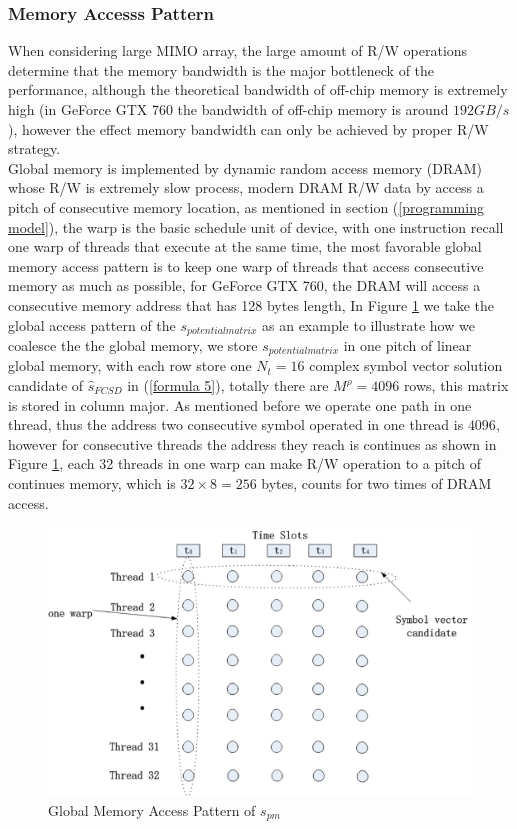 \documentclass[12pt,a4paper,final]{article}
\begin{document}
\begin{spacing}{2.5}
\subsubsection{Memory Accesss Pattern}
  When considering large MIMO array, the large amount of R/W operations determine that the memory bandwidth is the major bottleneck of the performance,  although the theoretical bandwidth of off-chip memory is extremely high (in GeForce GTX 760 the bandwidth of off-chip memory is around $192 GB/s$), however the effect memory bandwidth can only be achieved by proper R/W strategy.\\
  Global memory is implemented by dynamic random access memory (DRAM) whose R/W is extremely slow process, modern DRAM R/W data by access a pitch of consecutive memory location, as mentioned in section (\ref{programming model}), the warp is the basic schedule unit of device, with one instruction recall one warp of threads that execute at the same time, the most favorable global memory access pattern is to keep one warp of threads that access consecutive memory as much as possible, for GeForce GTX 760, the DRAM will access a consecutive memory address that has 128 bytes length, In Figure \ref{coalesce global memory} we take the global access pattern of the $\mathit{s_{potential matrix}}$ as an example to illustrate how we coalesce the the global memory,
we store $\mathit{s_{potential matrix}}$ in one pitch of linear global memory, with each row store one $N_{t}=16$ complex symbol vector solution candidate of $\hat{s}_{FCSD}$ in (\ref{formula 5}), totally there are $M^{\rho}=4096$ rows, this matrix is stored in column major. As mentioned before we operate one path in one thread, thus the address two consecutive symbol operated in one thread is $4096$, however for consecutive threads the address they reach is continues as shown in Figure \ref{coalesce global memory}, each 32 threads in one warp can make R/W operation to a pitch of continues memory, which is $32\times 8=256$ bytes, counts for two times of DRAM access.
\begin{figure}[htb]
\centering
\includegraphics[scale=0.63]{coalescing_global_memory.eps}
\caption{Global Memory Access Pattern of $\mathit{s_{pm}}$}
\label{coalesce global memory}
\end{figure}

\end{spacing}
\end{document}
